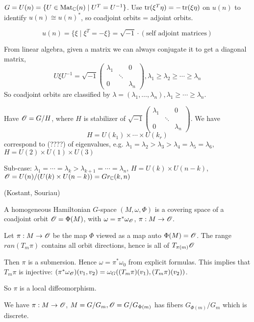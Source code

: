 \documentclass[x11names,reqno,14pt]{extarticle}
\begin{document}
$G = U(n) = \{U \in {\mathrm{Mat}}_{\mathbb{C}}(n)\mid U^T = U^{-1}\}$. Use $\operatorname{\mathrm{tr}}(\xi^T\eta) = -\operatorname{\mathrm{tr}}(\xi\eta)$ on $u(n)$ to identify $u(n) \cong u(n)^*$, so coadjoint orbits = adjoint orbits. 

\[
u(n) = \{\xi \mid \xi^T = -\xi\} = \sqrt{-1}\cdot(\text{self adjoint matrices})
\]

From linear algebra, given a matrix we can always conjugate it to get a diagonal matrix, 
\[
U\xi U^{-1} = \sqrt{-1}\begin{pmatrix} \lambda_1 & & 0 \\ & \ddots & \\ 0 & & \lambda_n\end{pmatrix}, \lambda_1\geq\lambda_2\geq\cdots\geq\lambda_n
\]
So coadjoint orbits are classified by $\lambda = (\lambda_1,\dots,\lambda_n), \lambda_1\geq\cdots\geq\lambda_n$.

Have $\mathscr{O} = G/H$, where $H$ is stabilizer of $\sqrt{-1}\begin{pmatrix} \lambda_1 & & 0 \\ & \ddots & \\ 0 & & \lambda_n\end{pmatrix}$. 
We have
\[
H = U(k_1)\times\cdots\times U(k_r)
\]
correspond to (????) of eigenvalues, e.g. $\lambda_1 = \lambda_2 >\lambda_3 > \lambda_4 = \lambda_5=\lambda_6$, $H = U(2)\times U(1)\times U(3)$

Sub-case: $\lambda_1 = \cdots = \lambda_k > \lambda_{k+1} = \cdots = \lambda_n$, $H = U(k)\times U(n-k)$, $\mathscr{O} = U(n)/(U(k)\times U(n-k)) = Gr_{\mathbb{C}}(k,n)$

\thm(Kostant, Souriau)

A homogeneous Hamiltonian $G$-space $(M,\omega,\Phi)$ is a covering space of a coadjoint orbit $\mathscr{O} = \Phi(M)$, with $\omega = \pi^*\omega_{\mathscr{O}}$, $\pi:M\to\mathscr{O}$. 

\proof

Let $\pi:M\to\mathscr{O}$ be the map $\Phi$ viewed as a map auto $\Phi(M) = \mathscr{O}$. The range $ran(T_m\pi)$ contains all orbit directions, hence is all of $T_{\pi(m)}\mathscr{O}$

Then $\pi$ is a submersion. Hence $\omega = \pi^*\omega_0$ from explicit formulas. This implies that $T_m\pi$ is injective: $(\pi^*\omega_{\mathscr{O}})(v_1,v_2) = \omega_G((T_m\pi)(v_1),(T_m\pi)(v_2))$. 

So $\pi$ is a local diffeomorphism. 

We have $\pi:M\to\mathscr{O}$, $M = G/G_m, \mathscr{O} = G/G_{\Phi(m)}$ has fibers $G_{\Phi(m)}/G_m$ which is discrete. 
\end{document}
